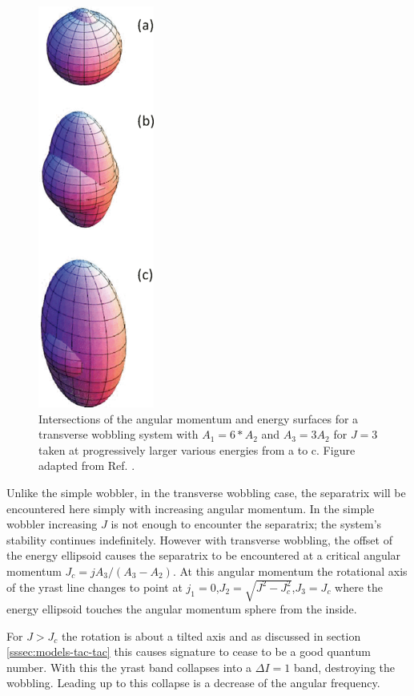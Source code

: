 \begin{figure}[t!]
\centerline{\includegraphics[height=0.4\textheight]{./img/c2/simple_am_orbits.png}}
	\caption{Intersections of the angular momentum and energy surfaces for a transverse wobbling system with $A_1=6*A_2$ and $A_3=3A_2$ for $J=3$ taken at progressively larger various energies from a to c. Figure adapted from Ref. \cite{frauendorfTransverseWobbling}.\label{fig:chp2-transverse-am-orbits}}
\end{figure}

Unlike the simple wobbler, in the transverse wobbling case, the separatrix will be encountered here simply with increasing angular momentum. In the simple wobbler increasing $J$ is not enough to encounter the separatrix; the system's stability continues indefinitely. However with transverse wobbling, the offset of the energy ellipsoid causes the separatrix to be encountered at a critical angular momentum $J_c=jA_3/(A_3-A_2)$. At this angular momentum the rotational axis of the yrast line changes to point at $j_1=0$,$J_2=\sqrt{J^2-J^2_c}$,$J_3=J_c$ where the energy ellipsoid touches the angular momentum sphere from the inside.

For $J>J_c$ the rotation is about a tilted axis and as discussed in section \ref{sssec:models-tac-tac} this causes signature to cease to be a good quantum number. With this the yrast band collapses into a $\Delta{}I=1$ band, destroying the wobbling. Leading up to this collapse is a decrease of the angular frequency.

